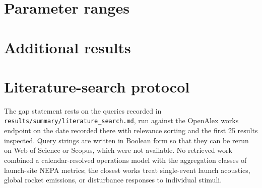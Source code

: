 \documentclass[11pt]{article}
\begin{document}
\section{Parameter ranges}

\begin{table}[htbp]
\caption{Sensitivity-analysis factors, ranges, source rank and notes. Rank 5 denotes a hypothetical range; rank 0 is the random-number seed of the realization, included as a factor so that Monte Carlo noise is attributed to its own index.}
\centering\scriptsize
\tableFactorRanges
\end{table}

\section{Additional results}

\begin{table}[htbp]
\caption{Differences between temporal models at fixed count (bootstrap 95\% intervals), from \texttt{e2\_differences.csv}.}
\centering\scriptsize
\tableTemporalModels
\end{table}

\begin{table}[htbp]
\caption{Probability that annual access-restriction hours exceed each cap, by per-launch closure distribution and cadence (Monte Carlo standard errors in the CSV).}
\centering\scriptsize
\tableCapProbabilities
\end{table}

\begin{table}[htbp]
\caption{Factors with total-order Sobol index above 0.05, by output and cadence. Rows for the random seed give the Monte Carlo share of the output variance.}
\centering\scriptsize
\tableDominantFactors
\end{table}

\begin{table}[htbp]
\caption{Fleet emissions above the tropopause (tonnes per year; median and 5th--95th percentiles of the input ranges).}
\centering\scriptsize
\tableEmissions
\end{table}

\section{Literature-search protocol}

The gap statement rests on the queries recorded in \texttt{results/summary/literature\_search.md}, run against the OpenAlex works endpoint on the date recorded there with relevance sorting and the first 25 results inspected. Query strings are written in Boolean form so that they can be rerun on Web of Science or Scopus, which were not available. No retrieved work combined a calendar-resolved operations model with the aggregation classes of launch-site NEPA metrics; the closest works treat single-event launch acoustics, global rocket emissions, or disturbance responses to individual stimuli.



\end{document}
